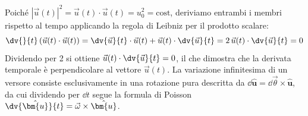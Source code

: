 \begin{dimostrazione}
Poiché $|\vec{u}(t)|^2 = \vec{u}(t)\cdot\vec{u}(t) = u_0^2 = \text{cost}$, deriviamo entrambi i membri rispetto al tempo applicando la regola di Leibniz per il prodotto scalare:
\begin{equation}
    \dv{}{t}\left(\vec{u}(t)\cdot\vec{u}(t)\right) = \dv{\vec{u}}{t}\cdot\vec{u}(t) + \vec{u}(t)\cdot\dv{\vec{u}}{t} = 2\,\vec{u}(t)\cdot\dv{\vec{u}}{t} = 0
\end{equation}
Dividendo per 2 si ottiene $\vec{u}(t)\cdot\dv{\vec{u}}{t} = 0$, il che dimostra che la derivata temporale è perpendicolare al vettore $\vec{u}(t)$. La variazione infinitesima di un versore consiste esclusivamente in una rotazione pura descritta da $\dd\hat{\bm{u}} = \dd\vec{\theta} \times \hat{\bm{u}}$, da cui dividendo per $\dd t$ segue la formula di Poisson $\dv{\hat{\bm{u}}}{t} = \vec{\omega}\times\hat{\bm{u}}$.
\end{dimostrazione}
